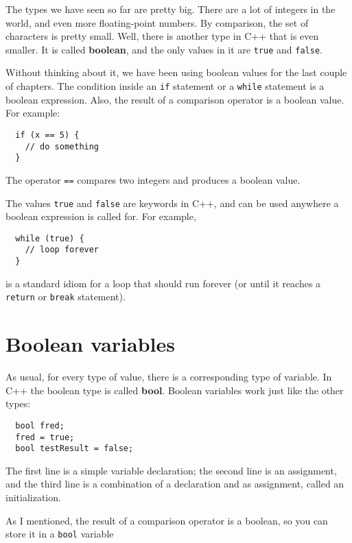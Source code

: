 The types we have seen so far are pretty big.  There are a lot
of integers in the world, and even more floating-point numbers.
By comparison, the set of characters is pretty small.  Well, there
is another type in C++ that is even smaller.  It is called
{\bf boolean}, and the only values in it are
{\tt true} and {\tt false}.

Without thinking about it, we have been using boolean values for the
last couple of chapters.  The condition inside an {\tt if}
statement or a {\tt while} statement is a boolean expression.
Also, the result of a comparison operator is a boolean value.
For example:

\begin{verbatim}
  if (x == 5) {
    // do something
  }
\end{verbatim}
%
The operator {\tt ==} compares two integers and produces a
boolean value.


The values {\tt true} and {\tt false} are keywords in C++,
and can be used anywhere a boolean expression is called for.
For example, 

\begin{verbatim}
  while (true) {
    // loop forever
  }
\end{verbatim}
%
is a standard idiom for a loop that should run forever (or
until it reaches a {\tt return} or {\tt break} statement).

\section{Boolean variables}

As usual, for every type of value, there is a corresponding
type of variable.  In C++ the boolean type is called {\bf bool}.
Boolean variables work just like the other types:

\begin{verbatim}
  bool fred;
  fred = true;
  bool testResult = false;
\end{verbatim}
%
The first line is a simple variable declaration;
the second line is an assignment, and the third line is a
combination of a declaration and as assignment, 
called an initialization.


As I mentioned, the result of a comparison operator is a boolean,
so you can store it in a {\tt bool} variable

